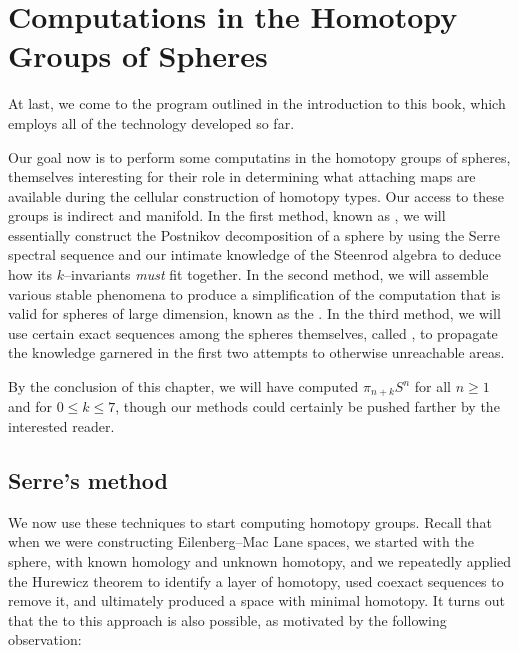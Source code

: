 
\chapter{Computations in the Homotopy Groups of Spheres}

At last, we come to the program outlined in the introduction to this book, which employs all of the technology developed so far.

Our goal now is to perform some computatins in the homotopy groups of spheres, themselves interesting for their role in determining what attaching maps are available during the cellular construction of homotopy types.
Our access to these groups is indirect and manifold.
In the first method, known as , we will essentially construct the Postnikov decomposition of a sphere by using the Serre spectral sequence and our intimate knowledge of the Steenrod algebra to deduce how its $k$--invariants \emph{must} fit together.
In the second method, we will assemble various stable phenomena to produce a simplification of the computation that is valid for spheres of large dimension, known as the .
In the third method, we will use certain exact sequences among the spheres themselves, called , to propagate the knowledge garnered in the first two attempts to otherwise unreachable areas.

By the conclusion of this chapter, we will have computed $\pi_{n+k} S^n$ for all $n \ge 1$ and for $0 \le k \le 7$, though our methods could certainly be pushed farther by the interested reader.




\section{Serre's method}\label{SerresMethod}

We now use these techniques to start computing homotopy groups.
Recall that when we were constructing Eilenberg--Mac Lane spaces, we started with the sphere, with known homology and unknown homotopy, and we repeatedly applied the Hurewicz theorem to identify a layer of homotopy, used coexact sequences to remove it, and ultimately produced a space with minimal homotopy.
It turns out that the  to this approach is also possible, as motivated by the following observation:

